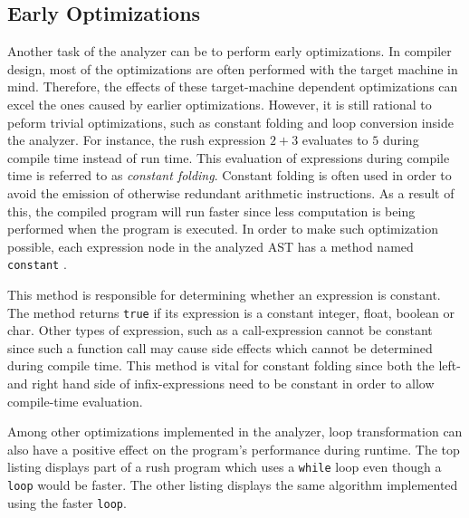 \subsection{Early Optimizations}

Another task of the analyzer can be to perform early optimizations.
In compiler design, most of the optimizations are often performed with the target machine in mind.
Therefore, the effects of these target-machine dependent optimizations can excel the ones caused by earlier optimizations.
However, it is still rational to peform trivial optimizations, such as constant folding and loop conversion inside the analyzer.
For instance, the rush expression $2 + 3$ evaluates to $5$ during compile time instead of run time.
This evaluation of expressions during compile time is referred to as \emph{constant folding}.
Constant folding is often used in order to avoid the emission of otherwise redundant arithmetic instructions.
As a result of this, the compiled program will run faster since less computation is being performed when the program is executed.
In order to make such optimization possible, each expression node in the analyzed AST has a method named \texttt{constant} \cite[p.~54]{wirth_compiler_construction_2005}.


This method is responsible for determining whether an expression is constant.
The method returns \texttt{true} if its expression is a constant integer, float, boolean or char.
Other types of expression, such as a call-expression cannot be constant since such a function call may cause side effects which cannot be determined during compile time.
This method is vital for constant folding since both the left- and right hand side of infix-expressions need to be constant in order to allow compile-time evaluation.

Among other optimizations implemented in the analyzer, loop transformation can also have a positive effect on the program's performance during runtime.
The top listing displays part of a rush program which uses a \texttt{while} loop even though a \texttt{loop} would be faster.
The other listing displays the same algorithm implemented using the faster \texttt{loop}.


